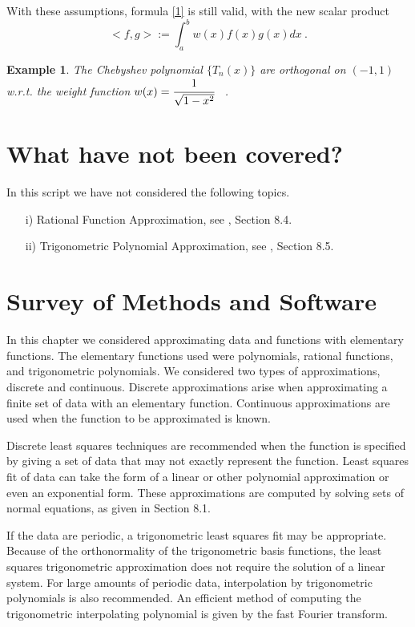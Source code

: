 \documentclass[12pt]{article}
\theoremstyle{theorem}
\newtheorem{exa}{Example}
\begin{document}
With these assumptions, formula \eqref{1} is still valid, with the new scalar product 
%
\[  <f,g> := \int_{a}^{b} w(x) f(x) g(x) dx \ . 
 \]
%

\begin{exa}
The Chebyshev polynomial $\{T_n(x)\}$ are orthogonal on $(-1, 1)$ w.r.t. the weight function $w(x) = \cfrac{1}{\sqrt{1-x^2}}$ \ .
\end{exa}

\section{What have not been covered?}

\begin{shaded}
In this script we have not considered the following topics.
\begin{enumerate}
 \item[i)] Rational Function Approximation, see \cite{BurF10}, Section 8.4. 
 \item[ii)] Trigonometric Polynomial Approximation, see \cite{BurF10}, Section 8.5. 
\end{enumerate}
\end{shaded}

\section{Survey of Methods and Software}
In this chapter we considered approximating data and functions with elementary functions.
The elementary functions used were polynomials, rational functions, and trigonometric
polynomials. We considered two types of approximations, discrete and continuous. Discrete
approximations arise when approximating a finite set of data with an elementary
function. Continuous approximations are used when the function to be approximated is
known.

Discrete least squares techniques are recommended when the function is specified by
giving a set of data that may not exactly represent the function. Least squares fit of data
can take the form of a linear or other polynomial approximation or even an exponential
form. These approximations are computed by solving sets of normal equations, as given in
Section 8.1.

If the data are periodic, a trigonometric least squares fit may be appropriate. Because
of the orthonormality of the trigonometric basis functions, the least squares trigonometric
approximation does not require the solution of a linear system. For large amounts of
periodic data, interpolation by trigonometric polynomials is also recommended. An efficient
method of computing the trigonometric interpolating polynomial is given by the fast
Fourier transform.
\end{document}
